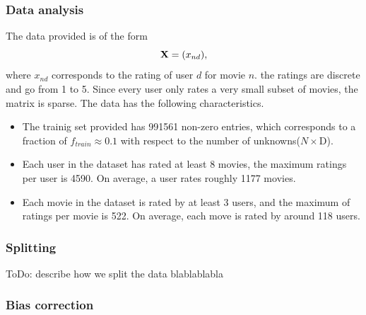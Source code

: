 \subsubsection{Data analysis}

The data provided is of the form 
\begin{equation}
  \mathbf{X} = (x_{nd}),
\end{equation}
where $x_{nd}$ corresponds to the rating of user $d$ for movie $n$.  
the ratings are discrete and go from 1 to 5. Since every user only rates a
very small subset of movies, the matrix is sparse. The data has the following
characteristics.

\begin{itemize}
  \item The trainig set provided has 991561 non-zero entries, which corresponds to 
a fraction of $f_{train} \approx 0.1$ with respect to the number of unknowns($N \times $D). 
  \item Each user in the dataset has rated at least 8 movies, the maximum
    ratings per user is 4590. On average, a user rates roughly 1177 movies.
  \item Each movie in the dataset is rated by at least 3 users, and the maximum
    of ratings per movie is 522. On average, each move is rated by around 118
    users. 
\end{itemize}

\subsubsection{Splitting}
\label{sec:splitting}

ToDo: describe how we split the data
blablablabla

\subsubsection{Bias correction}
\label{sec:biascorrection}

